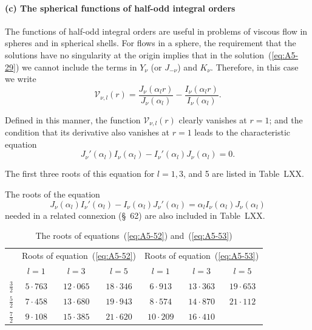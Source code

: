 \paragraph{(c) The spherical functions of half-odd integral orders}

The functions of half-odd integral orders are useful in problems of
viscous flow in spheres and in spherical shells. For flows in a sphere,
the requirement that the solutions have no singularity at the origin
implies that in the solution~(\ref{eq:A5-29}) we cannot include the terms in $Y_\nu$
(or $J_{-\nu}$) and $K_\nu$. Therefore, in this case we write
\begin{equation}
\label{eq:A5-51}
\mathscr{V}_{\nu,l}(r) = \frac{J_\nu(\alpha_l r)}{J_\nu(\alpha_l)} - \frac{I_\nu(\alpha_l r)}{I_\nu(\alpha_l)}.
\end{equation}

Defined in this manner, the function $\mathscr{V}_{\nu,l}(r)$ clearly vanishes at $r = 1$;
and the condition that its derivative also vanishes at $r = 1$ leads to
the characteristic equation
\begin{equation}
\label{eq:A5-52}
J_\nu'(\alpha_l) I_\nu(\alpha_l) - I_\nu'(\alpha_l) J_\nu(\alpha_l) = 0.
\end{equation}

The first three roots of this equation for $l = 1, 3$, and 5 are listed in
Table~LXX.

The roots of the equation
\begin{equation}
\label{eq:A5-53}
J_\nu(\alpha_l) I_\nu'(\alpha_l) - I_\nu(\alpha_l) J_\nu'(\alpha_l) = \alpha_l I_\nu(\alpha_l) J_\nu(\alpha_l)
\end{equation}
needed in a related connexion (\S~62) are also included in Table~LXX.

\begin{table}[htbp]
\centering
\caption{The roots of equations~(\ref{eq:A5-52}) and~(\ref{eq:A5-53})}
\label{tab:LXX}
\begin{tabular}{l|ccc|ccc}
\hline
 & \multicolumn{3}{c|}{Roots of equation~(\ref{eq:A5-52})} & \multicolumn{3}{c}{Roots of equation~(\ref{eq:A5-53})} \\
 & $l = 1$ & $l = 3$ & $l = 5$ & $l = 1$ & $l = 3$ & $l = 5$ \\
\hline
$\frac{3}{2}$ & $5{\cdot}763$ & $12{\cdot}065$ & $18{\cdot}346$ & $6{\cdot}913$ & $13{\cdot}363$ & $19{\cdot}653$ \\
$\frac{5}{2}$ & $7{\cdot}458$ & $13{\cdot}680$ & $19{\cdot}943$ & $8{\cdot}574$ & $14{\cdot}870$ & $21{\cdot}112$ \\
$\frac{7}{2}$ & $9{\cdot}108$ & $15{\cdot}385$ & $21{\cdot}620$ & $10{\cdot}209$ & $16{\cdot}410$ & \\
\hline
\end{tabular}
\end{table}

